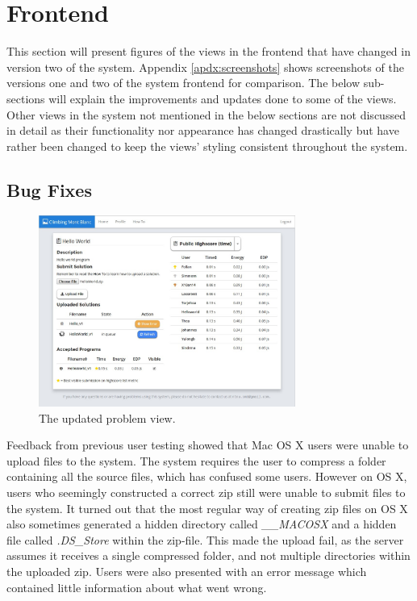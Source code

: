 \section{Frontend}
\label{sec:impr-frontend}
This section will present figures of the views in the frontend that have changed in version two of the system. Appendix \ref{apdx:screenshots} shows screenshots of the versions one and two of the system frontend for comparison. The below sub-sections will explain the improvements and updates done to some of the views. Other views in the system not mentioned in the below sections are not discussed in detail as their functionality nor appearance has changed drastically but have rather been changed to keep the views’ styling consistent throughout the system.

\subsection{Bug Fixes}
\label{sub-sec:impr-frontend-bug}
\begin{figure}[b!]
    \centering
    \includegraphics[width=0.75\textwidth]{figs/new_problem.jpg}
    \caption[The updated problem view]{The updated problem view.}
    \label{fig:new-problem}
\end{figure}
Feedback from previous user testing showed that Mac OS X users were unable to upload files to the system. The system requires the user to compress a folder containing all the source files, which has confused some users. However on OS X, users who seemingly constructed a correct zip still were unable to submit files to the system. It turned out that the most regular way of creating zip files on OS X also sometimes generated a hidden directory called \textit{\_\_MACOSX} and a hidden file called \textit{.DS\_Store} within the zip-file. This made the upload fail, as the server assumes it receives a single compressed folder, and not multiple directories within the uploaded zip. Users were also presented with an error message which contained little information about what went wrong. \\

